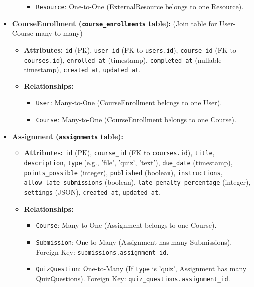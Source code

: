 \documentclass[12pt,a4paper]{article}
\begin{document}
\begin{itemize}
\begin{itemize}
\begin{itemize}
            \item \texttt{Resource}: One-to-One (ExternalResource belongs to one Resource).
        \end{itemize}
    \end{itemize}
    \item \textbf{CourseEnrollment (\texttt{course\_enrollments} table):} (Join table for User-Course many-to-many)
    \begin{itemize}
        \item \textbf{Attributes:} \texttt{id} (PK), \texttt{user\_id} (FK to \texttt{users.id}), \texttt{course\_id} (FK to \texttt{courses.id}), \texttt{enrolled\_at} (timestamp), \texttt{completed\_at} (nullable timestamp), \texttt{created\_at}, \texttt{updated\_at}.
        \item \textbf{Relationships:}
        \begin{itemize}
            \item \texttt{User}: Many-to-One (CourseEnrollment belongs to one User).
            \item \texttt{Course}: Many-to-One (CourseEnrollment belongs to one Course).
        \end{itemize}
    \end{itemize}
    \item \textbf{Assignment (\texttt{assignments} table):}
    \begin{itemize}
        \item \textbf{Attributes:} \texttt{id} (PK), \texttt{course\_id} (FK to \texttt{courses.id}), \texttt{title}, \texttt{description}, \texttt{type} (e.g., 'file', 'quiz', 'text'), \texttt{due\_date} (timestamp), \texttt{points\_possible} (integer), \texttt{published} (boolean), \texttt{instructions}, \texttt{allow\_late\_submissions} (boolean), \texttt{late\_penalty\_percentage} (integer), \texttt{settings} (JSON), \texttt{created\_at}, \texttt{updated\_at}.
        \item \textbf{Relationships:}
        \begin{itemize}
            \item \texttt{Course}: Many-to-One (Assignment belongs to one Course).
            \item \texttt{Submission}: One-to-Many (Assignment has many Submissions). Foreign Key: \texttt{submissions.assignment\_id}.
            \item \texttt{QuizQuestion}: One-to-Many (If \texttt{type} is 'quiz', Assignment has many QuizQuestions). Foreign Key: \texttt{quiz\_questions.assignment\_id}.

\end{itemize}
\end{itemize}
\end{itemize}
\end{document}
